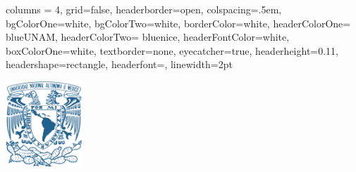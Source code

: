 \documentclass[a0paper,portrait]{baposter}
\begin{document}
\background{ }
\begin{poster}{
	columns = 4, 
	grid=false,
	headerborder=open, %
	colspacing=.5em, %
	bgColorOne=white, %
	bgColorTwo=white, %
	borderColor=white,%
	headerColorOne= blueUNAM, %
	headerColorTwo= bluenice, %
	headerFontColor=white,%
	boxColorOne=white, %
	textborder=none, %
	eyecatcher=true, %
	headerheight=0.11\textheight, %
	headershape=rectangle, %
	headerfont=\Large\textsf, %
	linewidth=2pt %
}
%
{\includegraphics[width=2.85cm]{../figures/image(1)}

}
\end{poster}
\end{document}
